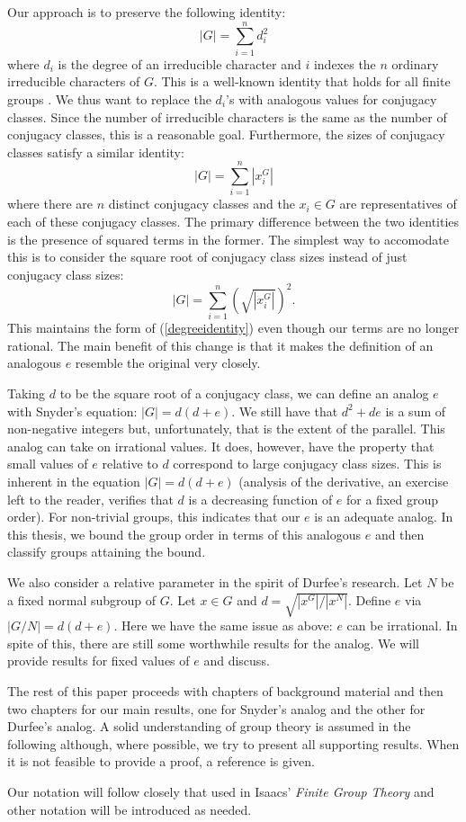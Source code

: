 \documentclass[main.tex]{subfiles}
\begin{document}
Our approach is to preserve the following identity:
\begin{equation}\label{degreeidentity}
|G| = \sum_{i=1}^n d_i^2
\end{equation}
where $d_i$ is the degree of an irreducible character and $i$ indexes the $n$ ordinary irreducible characters of $G$. This is a well-known identity that holds for all finite groups \cite{gorensteinfinitegroups}. We thus want to replace the $d_i$'s with analogous values for conjugacy classes. Since the number of irreducible characters is the same as the number of conjugacy classes, this is a reasonable goal. Furthermore, the sizes of conjugacy classes satisfy a similar identity:
$$|G| = \sum_{i=1}^n |x_i^G|$$
where there are $n$ distinct conjugacy classes and the $x_i \in G$ are representatives of each of these conjugacy classes. The primary difference between the two identities is the presence of squared terms in the former. The simplest way to accomodate this is to consider the square root of conjugacy class sizes instead of just conjugacy class sizes:
$$|G| = \sum_{i=1}^n \left(\sqrt{|x_i^G|}\right)^2\text{.}$$
This maintains the form of (\ref{degreeidentity}) even though our terms are no longer rational. The main benefit of this change is that it makes the definition of an analogous $e$ resemble the original very closely.

Taking $d$ to be the square root of a conjugacy class, we can define an analog $e$ with Snyder's equation: $|G| = d(d+e)$. We still have that  $d^2 + de$ is a sum of non-negative integers but, unfortunately, that is the extent of the parallel. This analog can take on irrational values. It does, however, have the property that small values of $e$ relative to $d$ correspond to large conjugacy class sizes. This is inherent in the equation $|G| = d(d + e)$ (analysis of the derivative, an exercise left to the reader, verifies that $d$ is a decreasing function of $e$ for a fixed group order). For non-trivial groups, this indicates that our $e$ is an adequate analog. In this thesis, we bound the group order in terms of this analogous $e$ and then classify groups attaining the bound.

We also consider a relative parameter in the spirit of Durfee's research. Let $N$ be a fixed normal subgroup of $G$. Let $x \in G$ and $d = \sqrt{|x^G|/|x^N|}$. Define $e$ via $|G/N| = d(d+e)$. Here we have the same issue as above: $e$ can be irrational. In spite of this, there are still some worthwhile results for the analog. We will provide results for fixed values of $e$ and discuss.

The rest of this paper proceeds with chapters of background material and then two chapters for our main results, one for Snyder's analog and the other for Durfee's analog. A solid understanding of group theory is assumed in the following although, where possible, we try to present all supporting results. When it is not feasible to provide a proof, a reference is given.

Our notation will follow closely that used in Isaacs' \emph{Finite Group Theory} \cite{isaacsfinitegrouptheory} and other notation will be introduced as needed.
\end{document}
